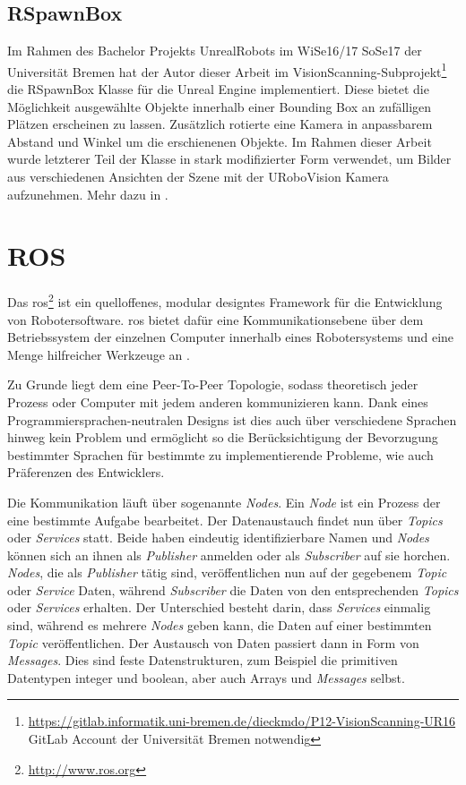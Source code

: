 \subsection{RSpawnBox}
\label{sec:rspawnbox}

Im Rahmen des Bachelor Projekts UnrealRobots im WiSe16/17 SoSe17 der Universität Bremen hat der Autor dieser Arbeit im VisionScanning-Subprojekt\footnote{\url{https://gitlab.informatik.uni-bremen.de/dieckmdo/P12-VisionScanning-UR16} GitLab Account der Universität Bremen notwendig} die RSpawnBox Klasse für die Unreal Engine implementiert. Diese bietet die Möglichkeit ausgewählte Objekte innerhalb einer Bounding Box an zufälligen Plätzen erscheinen zu lassen. Zusätzlich rotierte eine Kamera in anpassbarem Abstand und Winkel um die erschienenen Objekte. Im Rahmen dieser Arbeit wurde letzterer Teil der Klasse in stark modifizierter Form verwendet, um Bilder aus verschiedenen Ansichten der Szene mit der URoboVision Kamera aufzunehmen. Mehr dazu in .         

\section{ROS}
\label{sec:ros}
Das \gls{ros}\footnote{\url{http://www.ros.org}} ist ein quelloffenes, modular designtes Framework für die Entwicklung von Robotersoftware. \gls{ros} bietet dafür eine Kommunikationsebene über dem Betriebssystem der einzelnen Computer innerhalb eines Robotersystems und eine Menge hilfreicher Werkzeuge an \cite{ros}.\par 

Zu Grunde liegt dem eine Peer-To-Peer Topologie, sodass theoretisch jeder Prozess oder Computer mit jedem anderen kommunizieren kann. Dank eines Programmiersprachen-neutralen Designs ist dies auch über verschiedene Sprachen hinweg kein Problem und ermöglicht so die Berücksichtigung der Bevorzugung bestimmter Sprachen für bestimmte zu implementierende Probleme, wie auch Präferenzen des Entwicklers.\par

Die Kommunikation läuft über sogenannte \textit{Nodes}. Ein \textit{Node} ist ein Prozess der eine bestimmte Aufgabe bearbeitet. Der Datenaustauch findet nun über \textit{Topics} oder \textit{Services} statt. Beide haben eindeutig identifizierbare Namen und \textit{Nodes} können sich an ihnen als \textit{Publisher} anmelden oder als \textit{Subscriber} auf sie horchen. \textit{Nodes}, die als \textit{Publisher} tätig sind, veröffentlichen nun auf der gegebenem \textit{Topic} oder \textit{Service} Daten, während \textit{Subscriber} die Daten von den entsprechenden \textit{Topics} oder \textit{Services} erhalten. Der Unterschied besteht darin, dass \textit{Services} einmalig sind, während es mehrere \textit{Nodes} geben kann, die Daten auf einer bestimmten \textit{Topic} veröffentlichen. Der Austausch von Daten passiert dann in Form von \textit{Messages}. Dies sind feste Datenstrukturen, zum Beispiel die primitiven Datentypen integer und boolean, aber auch Arrays und \textit{Messages} selbst. \par

